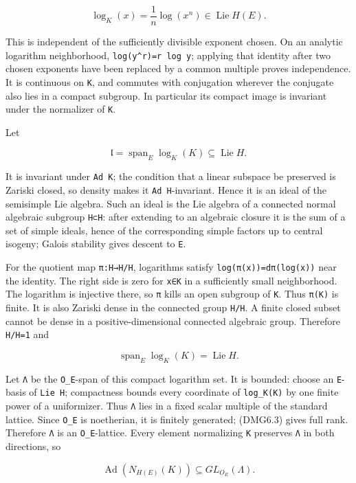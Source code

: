 \documentclass[
]{report}
\begin{document}
\[
\log_K(x)=\frac1n\log(x^n)\in\operatorname{Lie}H(E).
\tag{DMG6.1}
\]

This is independent of the sufficiently divisible exponent chosen. On an
analytic logarithm neighborhood, \texttt{log(y\^{}r)=r\ log\ y};
applying that identity after two chosen exponents have been replaced by
a common multiple proves independence. It is continuous on \texttt{K},
and commutes with conjugation wherever the conjugate also lies in a
compact subgroup. In particular its compact image is invariant under the
normalizer of \texttt{K}.

Let

\[
\mathfrak l=\operatorname{span}_E\log_K(K)\subseteq\operatorname{Lie}H.
\tag{DMG6.2}
\]

It is invariant under \texttt{Ad\ K}; the condition that a linear
subspace be preserved is Zariski closed, so density makes it
\texttt{Ad\ H}-invariant. Hence it is an ideal of the semisimple Lie
algebra. Such an ideal is the Lie algebra of a connected normal
algebraic subgroup \texttt{H\textquotesingle{}⊂H}: after extending to an
algebraic closure it is the sum of a set of simple ideals, hence of the
corresponding simple factors up to central isogeny; Galois stability
gives descent to \texttt{E}.

For the quotient map \texttt{π:H→H/H\textquotesingle{}}, logarithms
satisfy \texttt{log(π(x))=dπ(log(x))} near the identity. The right side
is zero for \texttt{x∈K} in a sufficiently small neighborhood. The
logarithm is injective there, so \texttt{π} kills an open subgroup of
\texttt{K}. Thus \texttt{π(K)} is finite. It is also Zariski dense in
the connected group \texttt{H/H\textquotesingle{}}. A finite closed
subset cannot be dense in a positive-dimensional connected algebraic
group. Therefore \texttt{H/H\textquotesingle{}=1} and

\[
\operatorname{span}_E\log_K(K)=\operatorname{Lie}H.
\tag{DMG6.3}
\]

Let \texttt{Λ} be the \texttt{O\_E}-span of this compact logarithm set.
It is bounded: choose an \texttt{E}-basis of \texttt{Lie\ H};
compactness bounds every coordinate of \texttt{log\_K(K)} by one finite
power of a uniformizer. Thus \texttt{Λ} lies in a fixed scalar multiple
of the standard lattice. Since \texttt{O\_E} is noetherian, it is
finitely generated; (DMG6.3) gives full rank. Therefore \texttt{Λ} is an
\texttt{O\_E}-lattice. Every element normalizing \texttt{K} preserves
\texttt{Λ} in both directions, so

\[
\operatorname{Ad}(N_{H(E)}(K))\subseteq GL_{O_E}(\Lambda).
\tag{DMG6.4}
\]
\end{document}
